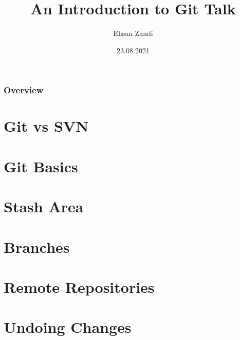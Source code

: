 \documentclass{beamer}
\title[Short title]{An Introduction to Git Talk} %
\author{Ehsan Zandi} %
\institute[DTIT] %
{
Deutsche Telekom IT \\ %
\medskip
ehsan.zandi@telekom.de
}
\date{23.08.2021} %
\begin{document}
\begin{frame}
\titlepage %
\end{frame}

\begin{frame}
\frametitle{Overview} %
\tableofcontents %
\end{frame}


\section{Git vs SVN} 

\section{Git Basics} 





\section{Stash Area} 
\section{Branches} 
\section{Remote Repositories} 
\section{Undoing Changes} 
\end{document}
